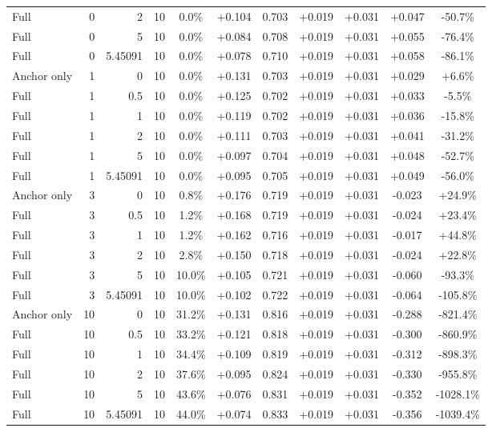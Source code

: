 \begin{table}[htbp]
\begin{tabular}{lrrrccccccc}
Full & 0 & 2 & 10 & 0.0\% & +0.104 & 0.703 & +0.019 & +0.031 & +0.047 & -50.7\% \\
Full & 0 & 5 & 10 & 0.0\% & +0.084 & 0.708 & +0.019 & +0.031 & +0.055 & -76.4\% \\
Full & 0 & 5.45091 & 10 & 0.0\% & +0.078 & 0.710 & +0.019 & +0.031 & +0.058 & -86.1\% \\
Anchor only & 1 & 0 & 10 & 0.0\% & +0.131 & 0.703 & +0.019 & +0.031 & +0.029 & +6.6\% \\
Full & 1 & 0.5 & 10 & 0.0\% & +0.125 & 0.702 & +0.019 & +0.031 & +0.033 & -5.5\% \\
Full & 1 & 1 & 10 & 0.0\% & +0.119 & 0.702 & +0.019 & +0.031 & +0.036 & -15.8\% \\
Full & 1 & 2 & 10 & 0.0\% & +0.111 & 0.703 & +0.019 & +0.031 & +0.041 & -31.2\% \\
Full & 1 & 5 & 10 & 0.0\% & +0.097 & 0.704 & +0.019 & +0.031 & +0.048 & -52.7\% \\
Full & 1 & 5.45091 & 10 & 0.0\% & +0.095 & 0.705 & +0.019 & +0.031 & +0.049 & -56.0\% \\
Anchor only & 3 & 0 & 10 & 0.8\% & +0.176 & 0.719 & +0.019 & +0.031 & -0.023 & +24.9\% \\
Full & 3 & 0.5 & 10 & 1.2\% & +0.168 & 0.719 & +0.019 & +0.031 & -0.024 & +23.4\% \\
Full & 3 & 1 & 10 & 1.2\% & +0.162 & 0.716 & +0.019 & +0.031 & -0.017 & +44.8\% \\
Full & 3 & 2 & 10 & 2.8\% & +0.150 & 0.718 & +0.019 & +0.031 & -0.024 & +22.8\% \\
Full & 3 & 5 & 10 & 10.0\% & +0.105 & 0.721 & +0.019 & +0.031 & -0.060 & -93.3\% \\
Full & 3 & 5.45091 & 10 & 10.0\% & +0.102 & 0.722 & +0.019 & +0.031 & -0.064 & -105.8\% \\
Anchor only & 10 & 0 & 10 & 31.2\% & +0.131 & 0.816 & +0.019 & +0.031 & -0.288 & -821.4\% \\
Full & 10 & 0.5 & 10 & 33.2\% & +0.121 & 0.818 & +0.019 & +0.031 & -0.300 & -860.9\% \\
Full & 10 & 1 & 10 & 34.4\% & +0.109 & 0.819 & +0.019 & +0.031 & -0.312 & -898.3\% \\
Full & 10 & 2 & 10 & 37.6\% & +0.095 & 0.824 & +0.019 & +0.031 & -0.330 & -955.8\% \\
Full & 10 & 5 & 10 & 43.6\% & +0.076 & 0.831 & +0.019 & +0.031 & -0.352 & -1028.1\% \\
Full & 10 & 5.45091 & 10 & 44.0\% & +0.074 & 0.833 & +0.019 & +0.031 & -0.356 & -1039.4\% \\

\end{tabular}
\end{table}
